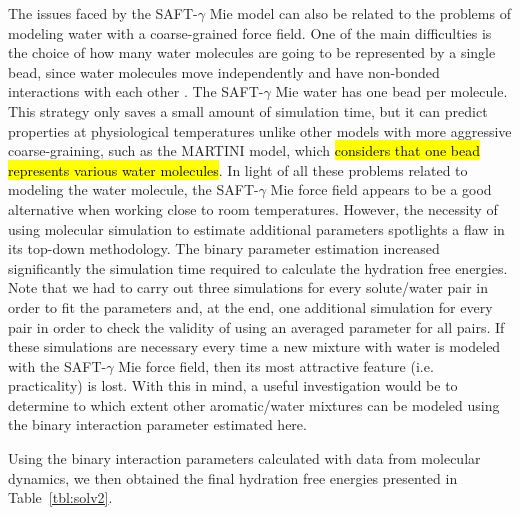 \documentclass[final,12p,times,twocolumn]{elsarticle}
\begin{document}
	The issues faced by the SAFT-$\gamma$ Mie model can also be related to the problems of modeling water with a coarse-grained force field. One of the main difficulties is the choice of how many water molecules are going to be represented by a single bead, since water molecules move independently and have non-bonded interactions with each other \cite{hadley2010,hadley2012}. The SAFT-$\gamma$ Mie water has one bead per molecule. This strategy only saves a small amount of simulation time, but it can predict properties at physiological temperatures unlike other models with more aggressive coarse-graining, such as the MARTINI model, which \hl{considers that one bead represents various water molecules}.
	In light of all these problems related to modeling the water molecule, the SAFT-$\gamma$ Mie force field appears to be a good alternative when working close to room temperatures. However, the necessity of using molecular simulation to estimate additional parameters spotlights a flaw in its top-down methodology. The binary parameter estimation increased significantly the simulation time required to calculate the hydration free energies. Note that we had to carry out three simulations for every solute/water pair in order to fit the parameters and, at the end, one additional simulation for every pair in order to check the validity of using an averaged parameter for all pairs. If these simulations are necessary every time a new mixture with water is modeled with the SAFT-$\gamma$ Mie force field, then its most attractive feature (i.e. practicality) is lost. With this in mind, a useful investigation would be to determine to which extent other aromatic/water mixtures can be modeled using the binary interaction parameter estimated here.

	Using the binary interaction parameters calculated with data from molecular dynamics, we then obtained the final hydration free energies presented in Table~\ref{tbl:solv2}.
\end{document}

